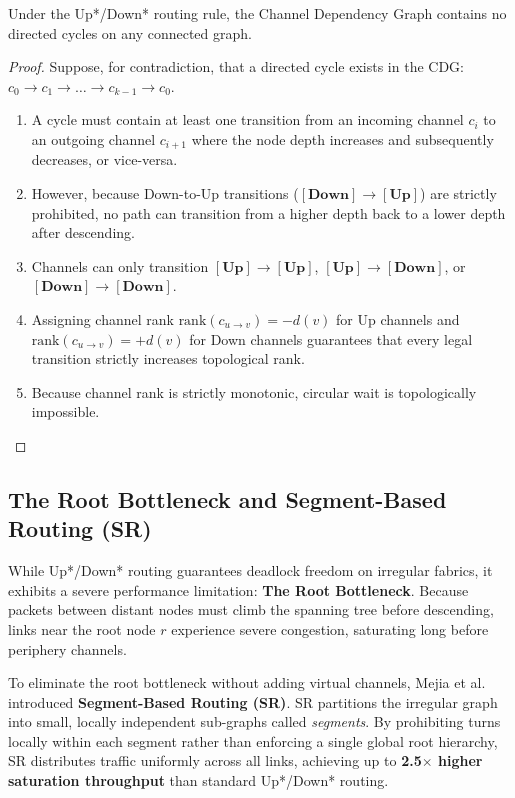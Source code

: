 \begin{theorem}
Under the Up*/Down* routing rule, the Channel Dependency Graph contains no directed cycles on any connected graph.
\end{theorem}

\begin{proof}
Suppose, for contradiction, that a directed cycle exists in the CDG: $c_0 \to c_1 \to \dots \to c_{k-1} \to c_0$.
\begin{enumerate}
    \item A cycle must contain at least one transition from an incoming channel $c_i$ to an outgoing channel $c_{i+1}$ where the node depth increases and subsequently decreases, or vice-versa.
    \item However, because Down-to-Up transitions ($[\textbf{Down}] \to [\textbf{Up}]$) are strictly prohibited, no path can transition from a higher depth back to a lower depth after descending.
    \item Channels can only transition $[\textbf{Up}] \to [\textbf{Up}]$, $[\textbf{Up}] \to [\textbf{Down}]$, or $[\textbf{Down}] \to [\textbf{Down}]$.
    \item Assigning channel rank $\text{rank}(c_{u \to v}) = -d(v)$ for Up channels and $\text{rank}(c_{u \to v}) = +d(v)$ for Down channels guarantees that every legal transition strictly increases topological rank.
    \item Because channel rank is strictly monotonic, circular wait is topologically impossible.
\end{enumerate}
\end{proof}

\subsection{The Root Bottleneck and Segment-Based Routing (SR)}
While Up*/Down* routing guarantees deadlock freedom on irregular fabrics, it exhibits a severe performance limitation: \textbf{The Root Bottleneck}. Because packets between distant nodes must climb the spanning tree before descending, links near the root node $r$ experience severe congestion, saturating long before periphery channels.

To eliminate the root bottleneck without adding virtual channels, Mejia et al.~\cite{Mejia2006} introduced \textbf{Segment-Based Routing (SR)}. SR partitions the irregular graph into small, locally independent sub-graphs called \emph{segments}. By prohibiting turns locally within each segment rather than enforcing a single global root hierarchy, SR distributes traffic uniformly across all links, achieving up to \textbf{2.5$\times$ higher saturation throughput} than standard Up*/Down* routing.

